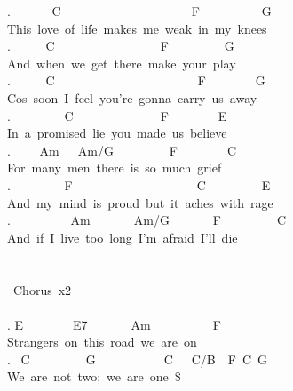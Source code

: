 {. \ \ \ \ \ \ C\ \ \ \ \ \ \ \ \ \ \ \ \ \ \ \ \ \ \ \ \ F\ \ \ \ \ \ \ \ \ \ G\\
This\ love\ of\ life\ makes\ me\ weak\ in\ my\ knees\\
. \ \ \ \ \ C\ \ \ \ \ \ \ \ \ \ \ \ \ \ \ \ \ F\ \ \ \ \ \ \ \ \ G\\
And\ when\ we\ get\ there\ make\ your\ play\\
. \ \ \ \ \ C\ \ \ \ \ \ \ \ \ \ \ \ \ \ \ \ \ \ \ \ \ \ \ F\ \ \ \ \ \ \ \ G\\
Cos\ soon\ I\ feel\ you're\ gonna\ carry\ us\ away\\
. \ \ \ \ \ \ \ \ C\ \ \ \ \ \ \ \ \ \ \ \ \ \ F\ \ \ \ \ \ \ \ E\\
In\ a\ promised\ lie\ you\ made\ us\ believe\\
. \ \ \ \ Am\ \ \ Am/G\ \ \ \ \ \ \ \ \ F\ \ \ \ \ \ \ \ C\\
For\ many\ men\ there\ is\ so\ much\ grief\\
. \ \ \ \ \ \ \ \ F\ \ \ \ \ \ \ \ \ \ \ \ \ \ \ \ \ \ \ \ C\ \ \ \ \ \ \ \ \ E\\
And\ my\ mind\ is\ proud\ but\ it\ aches\ with\ rage\\
. \ \ \ \ \ \ \ \ \ Am\ \ \ \ \ \ \ Am/G\ \ \ \ \ \ \ F\ \ \ \ \ \ \ \ \ C\\
And\ if\ I\ live\ too\ long\ I'm\ afraid\ I'll\ die\ \\
\\
\\
\lbrack\ Chorus\rbrack\ x2\\
\\
. E\ \ \ \ \ \ \ \ E7\ \ \ \ \ \ \ Am\ \ \ \ \ \ \ \ \ \ F\\
Strangers\ on\ this\ road\ we\ are\ on\\
. \ C\ \ \ \ \ \ \ \ \ G\ \ \ \ \ \ \ \ \ \ \ C\ \ \ C/B\ \ F\ C\ G\\
We\ are\ not\ two;\ we\ are\ one\ \$}

